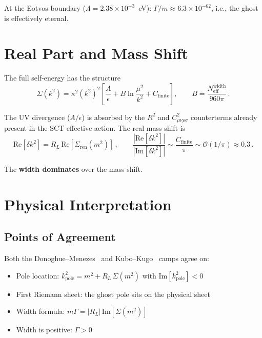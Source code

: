 \documentclass[11pt,a4paper]{article}
\newcommand{\order}{\mathcal{O}}
\newcommand{\Neff}{N_{\mathrm{eff}}}
\newcommand{\Imag}{\mathrm{Im}}
\newcommand{\Real}{\mathrm{Re}}
\begin{document}
At the Eotvos boundary ($\Lambda = 2.38 \times 10^{-3}$~eV):
$\Gamma/m \approx 6.3 \times 10^{-62}$, i.e., the ghost is
effectively eternal.


\section{Real Part and Mass Shift}
\label{sec:real-part}

The full self-energy has the structure
\begin{equation}
  \Sigma(k^2)
  = \kappa^2(k^2)^2\!\left[
    \frac{A}{\epsilon}
    + B\ln\!\frac{\mu^2}{k^2}
    + C_{\mathrm{finite}}
  \right]\!,
  \qquad
  B = \frac{\Neff^{\mathrm{width}}}{960\pi}\,.
\end{equation}

The UV divergence ($A/\epsilon$) is absorbed by the $R^2$ and
$C_{\mu\nu\rho\sigma}^2$ counterterms already present in the SCT
effective action.  The real mass shift is
\begin{equation}
  \Real[\delta k^2]
  = R_L\,\Real[\Sigma_{\mathrm{ren}}(m^2)]\,,
  \qquad
  \frac{|\Real[\delta k^2]|}{|\Imag[\delta k^2]|}
  \sim \frac{C_{\mathrm{finite}}}{\pi}
  \sim \order(1/\pi)
  \approx 0.3\,.
\end{equation}

The \textbf{width dominates} over the mass shift.


\section{Physical Interpretation}
\label{sec:interpretation}

\subsection{Points of Agreement}

Both the Donoghue--Menezes~\cite{Donoghue2019} and
Kubo--Kugo~\cite{KuboKugo2023} camps agree on:
\begin{itemize}[nosep]
  \item Pole location: $k^2_{\mathrm{pole}} = m^2 + R_L\,\Sigma(m^2)$
    with $\Imag[k^2_{\mathrm{pole}}] < 0$
  \item First Riemann sheet: the ghost pole sits on the physical sheet
    \cite{Buoninfante2025}
  \item Width formula: $m\Gamma = |R_L|\,\Imag[\Sigma(m^2)]$
  \item Width is positive: $\Gamma > 0$
\end{itemize}
\end{document}
